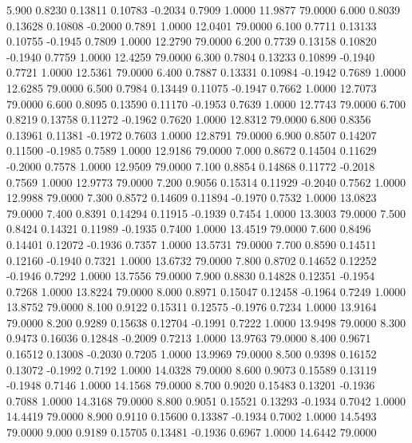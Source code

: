    5.900   0.8230   0.13811   0.10783  -0.2034   0.7909   1.0000  11.9877  79.0000
   6.000   0.8039   0.13628   0.10808  -0.2000   0.7891   1.0000  12.0401  79.0000
   6.100   0.7711   0.13133   0.10755  -0.1945   0.7809   1.0000  12.2790  79.0000
   6.200   0.7739   0.13158   0.10820  -0.1940   0.7759   1.0000  12.4259  79.0000
   6.300   0.7804   0.13233   0.10899  -0.1940   0.7721   1.0000  12.5361  79.0000
   6.400   0.7887   0.13331   0.10984  -0.1942   0.7689   1.0000  12.6285  79.0000
   6.500   0.7984   0.13449   0.11075  -0.1947   0.7662   1.0000  12.7073  79.0000
   6.600   0.8095   0.13590   0.11170  -0.1953   0.7639   1.0000  12.7743  79.0000
   6.700   0.8219   0.13758   0.11272  -0.1962   0.7620   1.0000  12.8312  79.0000
   6.800   0.8356   0.13961   0.11381  -0.1972   0.7603   1.0000  12.8791  79.0000
   6.900   0.8507   0.14207   0.11500  -0.1985   0.7589   1.0000  12.9186  79.0000
   7.000   0.8672   0.14504   0.11629  -0.2000   0.7578   1.0000  12.9509  79.0000
   7.100   0.8854   0.14868   0.11772  -0.2018   0.7569   1.0000  12.9773  79.0000
   7.200   0.9056   0.15314   0.11929  -0.2040   0.7562   1.0000  12.9988  79.0000
   7.300   0.8572   0.14609   0.11894  -0.1970   0.7532   1.0000  13.0823  79.0000
   7.400   0.8391   0.14294   0.11915  -0.1939   0.7454   1.0000  13.3003  79.0000
   7.500   0.8424   0.14321   0.11989  -0.1935   0.7400   1.0000  13.4519  79.0000
   7.600   0.8496   0.14401   0.12072  -0.1936   0.7357   1.0000  13.5731  79.0000
   7.700   0.8590   0.14511   0.12160  -0.1940   0.7321   1.0000  13.6732  79.0000
   7.800   0.8702   0.14652   0.12252  -0.1946   0.7292   1.0000  13.7556  79.0000
   7.900   0.8830   0.14828   0.12351  -0.1954   0.7268   1.0000  13.8224  79.0000
   8.000   0.8971   0.15047   0.12458  -0.1964   0.7249   1.0000  13.8752  79.0000
   8.100   0.9122   0.15311   0.12575  -0.1976   0.7234   1.0000  13.9164  79.0000
   8.200   0.9289   0.15638   0.12704  -0.1991   0.7222   1.0000  13.9498  79.0000
   8.300   0.9473   0.16036   0.12848  -0.2009   0.7213   1.0000  13.9763  79.0000
   8.400   0.9671   0.16512   0.13008  -0.2030   0.7205   1.0000  13.9969  79.0000
   8.500   0.9398   0.16152   0.13072  -0.1992   0.7192   1.0000  14.0328  79.0000
   8.600   0.9073   0.15589   0.13119  -0.1948   0.7146   1.0000  14.1568  79.0000
   8.700   0.9020   0.15483   0.13201  -0.1936   0.7088   1.0000  14.3168  79.0000
   8.800   0.9051   0.15521   0.13293  -0.1934   0.7042   1.0000  14.4419  79.0000
   8.900   0.9110   0.15600   0.13387  -0.1934   0.7002   1.0000  14.5493  79.0000
   9.000   0.9189   0.15705   0.13481  -0.1936   0.6967   1.0000  14.6442  79.0000
